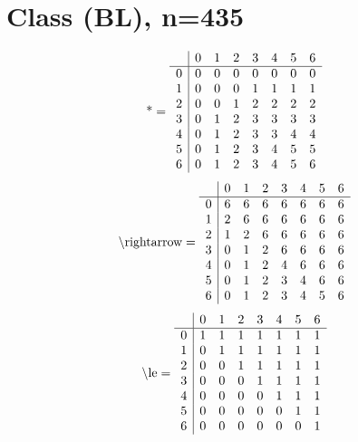 \documentclass[11pt]{article}
\begin{document}
\section{Class (BL), n=435}
\[\text{*} = 
\begin{array}{r | r r r r r r r}
 & 0 & 1 & 2 & 3 & 4 & 5 & 6 \\ \hline
0 & 0 & 0 & 0 & 0 & 0 & 0 & 0 \\
1 & 0 & 0 & 0 & 1 & 1 & 1 & 1 \\
2 & 0 & 0 & 1 & 2 & 2 & 2 & 2 \\
3 & 0 & 1 & 2 & 3 & 3 & 3 & 3 \\
4 & 0 & 1 & 2 & 3 & 3 & 4 & 4 \\
5 & 0 & 1 & 2 & 3 & 4 & 5 & 5 \\
6 & 0 & 1 & 2 & 3 & 4 & 5 & 6 \\
\end{array}
\]
\[\text{\textbackslash rightarrow} = 
\begin{array}{r | r r r r r r r}
 & 0 & 1 & 2 & 3 & 4 & 5 & 6 \\ \hline
0 & 6 & 6 & 6 & 6 & 6 & 6 & 6 \\
1 & 2 & 6 & 6 & 6 & 6 & 6 & 6 \\
2 & 1 & 2 & 6 & 6 & 6 & 6 & 6 \\
3 & 0 & 1 & 2 & 6 & 6 & 6 & 6 \\
4 & 0 & 1 & 2 & 4 & 6 & 6 & 6 \\
5 & 0 & 1 & 2 & 3 & 4 & 6 & 6 \\
6 & 0 & 1 & 2 & 3 & 4 & 5 & 6 \\
\end{array}
\]
\[\text{\textbackslash le} = 
\begin{array}{r | r r r r r r r}
 & 0 & 1 & 2 & 3 & 4 & 5 & 6 \\ \hline
0 & 1 & 1 & 1 & 1 & 1 & 1 & 1 \\
1 & 0 & 1 & 1 & 1 & 1 & 1 & 1 \\
2 & 0 & 0 & 1 & 1 & 1 & 1 & 1 \\
3 & 0 & 0 & 0 & 1 & 1 & 1 & 1 \\
4 & 0 & 0 & 0 & 0 & 1 & 1 & 1 \\
5 & 0 & 0 & 0 & 0 & 0 & 1 & 1 \\
6 & 0 & 0 & 0 & 0 & 0 & 0 & 1 \\
\end{array}
\]
\end{document}
